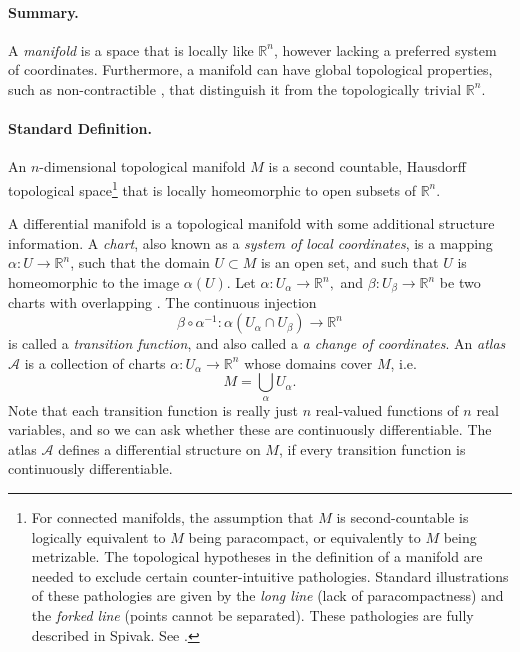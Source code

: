 \documentclass{article}
\newcommand{\reals}{\mathbb{R}}
\newcommand{\cA}{\mathcal{A}}
\begin{document}
\paragraph{Summary.} A {\em manifold} is a space that is
locally like $\reals^n$, however lacking a preferred system of
coordinates.  Furthermore, a manifold can have global topological
properties, such as non-contractible , that distinguish it from
the topologically trivial $\reals^n$.

\paragraph{Standard Definition.} 
An $n$-dimensional topological manifold $M$ is a second countable, Hausdorff
topological space\footnote{For connected manifolds, the  assumption that $M$ is
second-countable  is logically equivalent to $M$ being paracompact, or
equivalently to $M$ being metrizable. The topological hypotheses in the definition of a manifold are needed
to exclude certain counter-intuitive pathologies.  Standard
illustrations of these pathologies are given by the {\em long line}
(lack of paracompactness) and the {\em forked line} (points cannot be
separated). These pathologies are fully described in Spivak. 
See .} 
that is locally homeomorphic to open subsets of
$\reals^n$.

A differential manifold is a topological manifold with some additional
structure information.  A \emph{chart}, also known as a \emph{system
  of local coordinates}, is a mapping $\alpha: U \to \reals^n$, such that the domain $U\subset M$ is an open set, and such that $U$ is homeomorphic to the image $\alpha(U)$.  Let
$\alpha: U_\alpha \rightarrow \reals^n,$ and
$\beta:U_\beta\rightarrow\reals^n$ be two charts with overlapping
. The continuous injection
$$\beta\circ\alpha^{-1}: \alpha(U_\alpha\cap
U_\beta)\rightarrow\reals^n$$
is called a \emph{transition function},
and also called a \emph{a change of coordinates}.  An {\em atlas}
$\cA$ is a collection of charts $\alpha:U_\alpha\rightarrow\reals^n$
whose domains cover $M$, i.e.
$$M = \bigcup_{\alpha} U_\alpha.$$
Note that each transition function
is really just $n$ real-valued functions of $n$ real variables, and so
we can ask whether these are continuously differentiable. The atlas
$\cA$ defines a differential structure on $M$, if every transition function 
is continuously differentiable.
\end{document}
